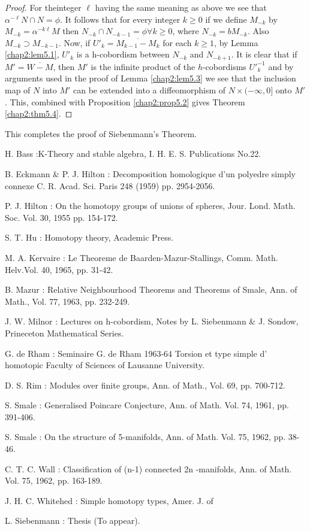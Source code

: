 \begin{proof}
For the\pageoriginale integer $\ell$ having the same meaning as above
we see that 
$\alpha^{-\ell} N \cap N = \phi$. It follows that for every integer
$k\geq 0$ if we define $M_{-k}$ by $M_{-k} = \alpha^{-k \ell}M$ then $
N_{-k}\cap N_{-k-1} = \phi \forall k \geq 0$, where $ N_{-k} =
bM_{-k}$. Also $M_{-k} \supset M_{-k-1}$. Now, if $U'_k=
\overline{M_{k-1}- M_k}$ for each $k\geq 1$, by Lemma \ref{chap2:lem5.1}, $U'_k$ is a
h-cobordism between $N_{-k}$ and $N_{-k+1}$. It is clear that if $M' =
\overline{W -M}$, then $M'$ is the infinite product of the
$h$-cobordisms $U'^{-1}_k$ and by arguments used in the proof of Lemma
\ref{chap2:lem5.3} we see that the inclusion map of $N$ into $M'$ can be extended
into a diffeomorphism of $N \times (-\infty, 0]$ onto $M'$. This,
    combined with Proposition \ref{chap2:prop5.2} gives Theorem \ref{chap2:thm5.4}. 
\end{proof}

This completes the proof of Siebenmann's Theorem.

\begin{thebibliography}{99}
 {H. Bass} :\pageoriginale K-Theory and stable algebra,
  I. H. E. S. Publications No.22. 

 {B. Eckmann \& P. J. Hilton} : Decomposition homologique
  d'un polyedre simply connexe C. R. Acad. Sci. Paris 248 (1959)
  pp. 2954-2056.  

 {P. J. Hilton} : On the homotopy groups of unions of
  spheres, Jour. Lond. Math. Soc. Vol. 30, 1955 pp. 154-172. 

 {S. T. Hu} : Homotopy theory, Academic Press.  

 {M. A. Kervaire} : Le Theoreme de Baarden-Mazur-Stallings,
  Comm. Math. Helv.Vol. 40, 1965, pp. 31-42.  

 {B. Mazur} : Relative Neighbourhood Theorems and Theorems
  of Smale, Ann. of Math., Vol. 77, 1963, pp. 232-249. 

 {J. W. Milnor} : Lectures on h-cobordism, Notes by
  L. Siebenmann \& J. Sondow, Prineceton Mathematical Series. 

 {G. de Rham} : Seminaire G. de Rham 1963-64 Torsion et
  type simple d' homotopic Faculty of Sciences of Lausanne University.  

 {D. S. Rim} : Modules over finite groups, Ann. of Math.,
  Vol. 69, pp. 700-712. 

 {S. Smale} : Generalised Poincare Conjecture, Ann. of
  Math. Vol. 74, 1961, pp. 391-406.  

 {S. Smale} : On the structure of 5-manifolds, Ann. of
  Math. Vol. 75, 1962, pp. 38-46.  

 {C. T. C. Wall} : Classification of (n-1) connected 2n
  -manifolds, Ann. of Math. Vol. 75, 1962, pp. 163-189.  

 {J. H. C. Whitehed} : Simple homotopy types, Amer. J. of  

 {L. Siebenmann} : Thesis (To appear). 
\end{thebibliography}

